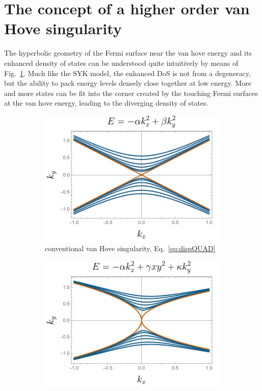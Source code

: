 \section{The concept of a higher order van Hove singularity} 
The hyperbolic geometry of the Fermi surface near the van hove energy and its enhanced density of states can be understood quite intuitively by means of Fig.~\ref{fig:logcontours}. Much like the SYK model, the enhanced DoS is not from a degeneracy, but the ability to pack energy levels densely close together at low energy. More and more states can be fit into the corner created by the touching Fermi surfaces at the van hove energy, leading to the diverging density of states.
\begin{figure}[h]
    \centering
    \begin{subfigure}[t]{0.45\linewidth}
        \centering
        \includegraphics[width=\textwidth]{figures/introduction/logcontours.pdf}
        \caption{\centering conventional van Hove singularity, Eq.~\eqref{eq:dispQUAD}}
        \label{fig:logcontours}
    \end{subfigure}
    \hfill
    \begin{subfigure}[t]{0.45\linewidth}
        \centering
        \includegraphics[width=\textwidth]{figures/introduction/paracontours.pdf}

\end{subfigure}
\end{figure}
